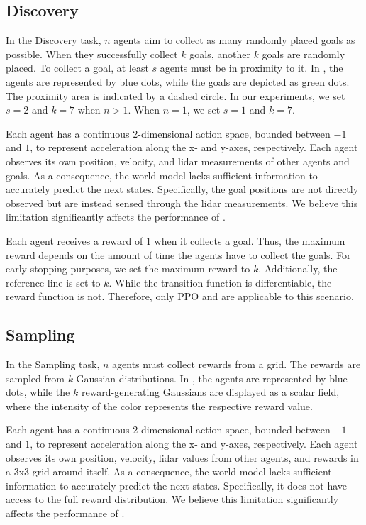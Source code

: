 \subsection{Discovery}
In the Discovery task, $n$ agents aim to collect as many randomly placed goals as possible. When they successfully collect $k$ goals, another $k$ goals are randomly placed. To collect a goal, at least $s$ agents must be in proximity to it. In , the agents are represented by blue dots, while the goals are depicted as green dots. The proximity area is indicated by a dashed circle. In our experiments, we set $s=2$ and $k=7$ when $n > 1$. When $n = 1$, we set $s=1$ and $k=7$.

Each agent has a continuous 2-dimensional action space, bounded between $-1$ and $1$, to represent acceleration along the x- and y-axes, respectively. Each agent observes its own position, velocity, and lidar measurements of other agents and goals. As a consequence, the world model lacks sufficient information to accurately predict the next states. Specifically, the goal positions are not directly observed but are instead sensed through the lidar measurements. We believe this limitation significantly affects the performance of \fname{}.

Each agent receives a reward of $1$ when it collects a goal. Thus, the maximum reward depends on the amount of time the agents have to collect the goals. For early stopping purposes, we set the maximum reward to $k$. Additionally, the reference line is set to $k$. While the transition function is differentiable, the reward function is not. Therefore, only PPO and \fname{} are applicable to this scenario.

\subsection{Sampling}
In the Sampling task, $n$ agents must collect rewards from a grid. The rewards are sampled from $k$ Gaussian distributions. In , the agents are represented by blue dots, while the $k$ reward-generating Gaussians are displayed as a scalar field, where the intensity of the color represents the respective reward value.

Each agent has a continuous 2-dimensional action space, bounded between $-1$ and $1$, to represent acceleration along the x- and y-axes, respectively. Each agent observes its own position, velocity, lidar values from other agents, and rewards in a 3x3 grid around itself. As a consequence, the world model lacks sufficient information to accurately predict the next states. Specifically, it does not have access to the full reward distribution. We believe this limitation significantly affects the performance of \fname{}.

